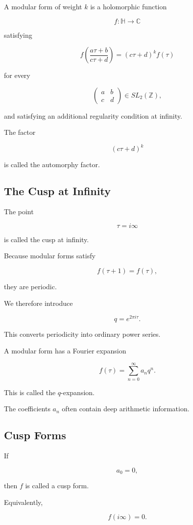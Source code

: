 \documentclass[12pt,a4paper]{article}
\theoremstyle{notespace}
\begin{document}
A modular form of weight \(k\) is a holomorphic function

\[
f:\mathbb H\to\mathbb C
\]

satisfying

\[
f\!\left(
\frac{a\tau+b}{c\tau+d}
\right)
=
(c\tau+d)^k f(\tau)
\]

for every

\[
\begin{pmatrix}
	a&b\\
	c&d
\end{pmatrix}
\in SL_2(\mathbb Z),
\]

and satisfying an additional regularity condition at infinity.

The factor

\[
(c\tau+d)^k
\]

is called the automorphy factor.

\subsection{The Cusp at Infinity}

The point

\[
\tau=i\infty
\]

is called the cusp at infinity.

Because modular forms satisfy

\[
f(\tau+1)=f(\tau),
\]

they are periodic.

We therefore introduce

\[
q=e^{2\pi i\tau}.
\]

This converts periodicity into ordinary power series.

A modular form has a Fourier expansion

\[
f(\tau)
=
\sum_{n=0}^{\infty}
a_n q^n.
\]

This is called the \(q\)-expansion.

The coefficients \(a_n\) often contain deep arithmetic information.

\subsection{Cusp Forms}

If

\[
a_0=0,
\]

then \(f\) is called a cusp form.

Equivalently,

\[
f(i\infty)=0.
\]
\end{document}

